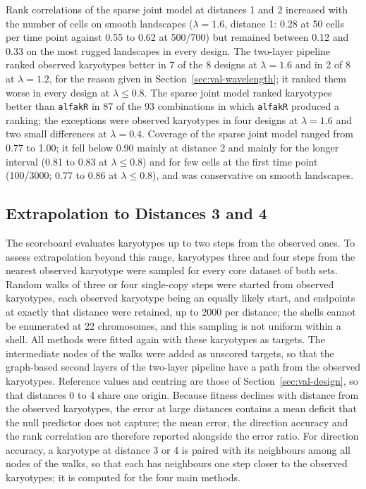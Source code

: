 \documentclass[11pt]{article}
\begin{document}
Rank correlations of the sparse joint model at distances 1 and 2 increased
with the number of cells on smooth landscapes ($\lambda=1.6$, distance 1: 0.28 at 50
cells per time point against 0.55 to 0.62 at 500/700) but remained between 0.12
and 0.33 on the most rugged landscapes in every design. The two-layer
pipeline ranked observed karyotypes better in 7 of the 8 designs at
$\lambda=1.6$ and in 2 of 8 at $\lambda=1.2$, for the reason given in
Section~\ref{sec:val-wavelength}; it ranked them worse in every design at
$\lambda\le0.8$. The sparse joint model ranked karyotypes better than
\texttt{alfakR} in 87 of the 93 combinations in which \texttt{alfakR} produced
a ranking; the exceptions were observed karyotypes in four designs at
$\lambda=1.6$ and two small differences at $\lambda=0.4$. Coverage of the
sparse joint model ranged from 0.77 to 1.00;
it fell below 0.90 mainly at distance 2 and mainly for the longer interval
(0.81 to 0.83 at $\lambda\le0.8$) and for few cells at the first time point (100/3000;
0.77 to 0.86 at $\lambda\le0.8$), and was conservative on smooth landscapes.

\subsection{Extrapolation to Distances 3 and 4}
\label{sec:val-far}

The scoreboard evaluates karyotypes up to two steps from the observed ones.
To assess extrapolation beyond this range, karyotypes three and four steps
from the nearest observed karyotype were sampled for every core dataset of
both sets. Random walks of three or four single-copy steps were started from
observed karyotypes, each observed karyotype being an equally likely start,
and endpoints at exactly that distance were retained, up to 2000 per
distance; the shells cannot be enumerated at 22 chromosomes, and this
sampling is not uniform within a shell. All methods were fitted again with
these karyotypes as targets. The intermediate nodes of the walks were added
as unscored targets, so that the graph-based second layers of the two-layer
pipeline have a path from the observed karyotypes. Reference values and
centring are those of Section~\ref{sec:val-design}, so that distances 0 to 4
share one origin. Because fitness declines with distance from the observed
karyotypes, the error at large distances contains a mean deficit that the
null predictor does not capture; the mean error, the direction accuracy and
the rank correlation are therefore reported alongside the error ratio. For
direction accuracy, a karyotype at distance 3 or 4 is paired with its
neighbours among all nodes of the walks, so that each has neighbours one step
closer to the observed karyotypes; it is computed for the four main methods.
\end{document}
